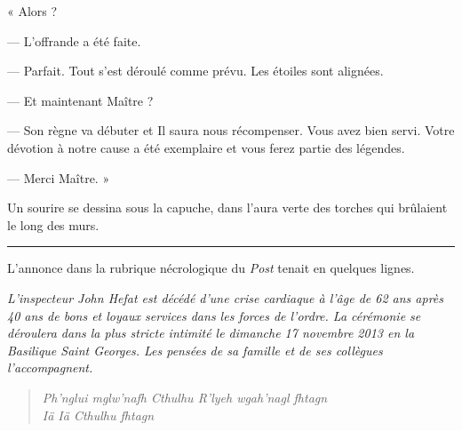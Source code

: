 « Alors ?

— L'offrande a été faite.

— Parfait. Tout s'est déroulé comme prévu. Les étoiles sont alignées.

— Et maintenant Maître ?

— Son règne va débuter et Il saura nous récompenser. Vous avez bien servi. Votre dévotion à notre cause a été 
exemplaire et vous ferez partie des légendes.

— Merci Maître. »

Un sourire se dessina sous la capuche, dans l'aura verte des torches qui brûlaient le long des murs.

\fancybreak{$* * *$}

L'annonce dans la rubrique nécrologique du \emph{Post} tenait en quelques lignes.

\emph{L'inspecteur John Hefat est décédé d'une crise cardiaque à l'âge de 62 ans après 40 ans de bons et loyaux 
services dans les forces de l'ordre. La cérémonie se déroulera dans la plus stricte intimité le dimanche 17 novembre 
2013 en la Basilique Saint Georges. Les pensées de sa famille et de ses collègues l'accompagnent.}

\begin{verse}
\emph{Ph’nglui mglw’nafh Cthulhu R’lyeh wgah’nagl fhtagn \\
Iä Iä Cthulhu fhtagn}
\end{verse}